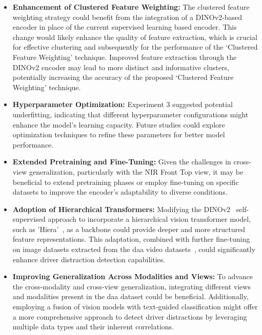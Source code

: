 \begin{itemize}
    \item \textbf{Enhancement of Clustered Feature Weighting:} The clustered feature weighting strategy could benefit from the integration of a DINOv2-based encoder in place of the current supervised learning based encoder. This change would likely enhance the quality of feature extraction, which is crucial for effective clustering and subsequently for the performance of the `Clustered Feature Weighting' technique. Improved feature extraction through the DINOv2 encoder may lead to more distinct and informative clusters, potentially increasing the accuracy of the proposed `Clustered Feature Weighting' technique.

    \item \textbf{Hyperparameter Optimization:} Experiment 3 suggested potential underfitting, indicating that different hyperparameter configurations might enhance the model's learning capacity. Future studies could explore optimization techniques to refine these parameters for better model performance.

    \item \textbf{Extended Pretraining and Fine-Tuning:} Given the challenges in cross-view generalization, particularly with the NIR Front Top view, it may be beneficial to extend pretraining phases or employ fine-tuning on specific datasets to improve the encoder’s adaptability to diverse conditions.

    \item \textbf{Adoption of Hierarchical Transformers:} Modifying the DINOv2~\citep{dinov2_oquab2023dinov2} self-supervised approach to incorporate a hierarchical vision transformer model, such as 'Hiera'~\citep{ryali2023hiera}, as a backbone could provide deeper and more structured feature representations. This adaptation, combined with further fine-tuning on image datasets extracted from the \gls{daa} video datasets~\citep{martin2019drive_and_act_2019_iccv}, could significantly enhance driver distraction detection capabilities.

    \item \textbf{Improving Generalization Across Modalities and Views:} To advance the cross-modality and cross-view generalization, integrating different views and modalities present in the \gls{daa} dataset could be beneficial. Additionally, employing a fusion of vision models with text-guided classification might offer a more comprehensive approach to detect driver distractions by leveraging multiple data types and their inherent correlations.


\end{itemize}

